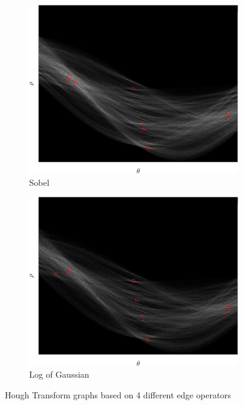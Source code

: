 \documentclass[lettersize,journal]{IEEEtran}
\begin{document}
\begin{figure}[h]
    \begin{subfigure}[h]{0.21\textwidth}
        \centering
        \includegraphics[width=\linewidth]{hough_transform_sobel_0.025}
        \caption{Sobel}  
    \end{subfigure}
    \begin{subfigure}[h]{0.21\textwidth}
        \centering
        \includegraphics[width=\linewidth]{hough_transform_log}
        \caption{Log of Gaussian}  
    \end{subfigure}
    \caption{Hough Transform graphs based on 4 different edge operators}
    \label{fig:8}
\end{figure}
\end{document}
